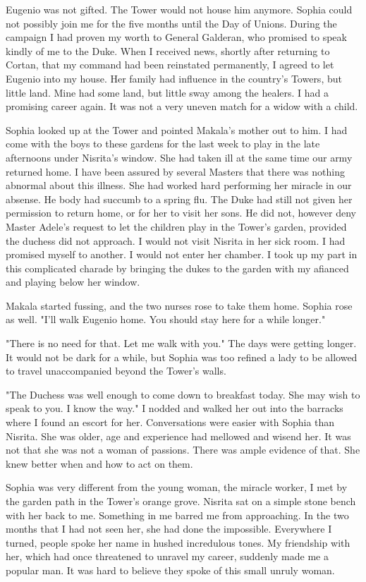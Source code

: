 \documentclass{article}
\begin{document}
Eugenio was not gifted. The Tower would not house him anymore. Sophia could not possibly join me for the five months until the Day of Unions. During the campaign I had proven my worth to General Galderan, who promised to speak kindly of me to the Duke. When I received news, shortly after returning to Cortan, that my command had been reinstated permanently, I agreed to let Eugenio into my house. Her family had influence in the country's Towers, but little land. Mine had some land, but little sway among the healers. I had a promising career again. It was not a very uneven match for a widow with a child.

Sophia looked up at the Tower and pointed Makala's mother out to him. I had come with the boys to these gardens for the last week to play in the late afternoons under Nisrita's window. She had taken ill at the same time our army returned home. I have been assured by several Masters that there was nothing abnormal about this illness. She had worked hard performing her miracle in our absense. He body had succumb to a spring flu. The Duke had still not given her permission to return home, or for her to visit her sons. He did not, however deny Master Adele's request to let the children play in the Tower's garden, provided the duchess did not approach. I would not visit Nisrita in her sick room. I had promised myself to another. I would not enter her chamber. I took up my part in this complicated charade by bringing the dukes to the garden with my afianced and playing below her window.

Makala started fussing, and the two nurses rose to take them home. Sophia rose as well. "I'll walk Eugenio home. You should stay here for a while longer."

"There is no need for that. Let me walk with you." The days were getting longer. It would not be dark for a while, but Sophia was too refined a lady to be allowed to travel unaccompanied beyond the Tower's walls.

"The Duchess was well enough to come down to breakfast today. She may wish to speak to you. I know the way." I nodded and walked her out into the barracks where I found an escort for her. Conversations were easier with Sophia than Nisrita. She was older, age and experience had mellowed and wisend her. It was not that she was not a woman of passions. There was ample evidence of that. She knew better when and how to act on them. 

Sophia was very different from the young woman, the miracle worker, I met by the garden path in the Tower's orange grove. Nisrita sat on a simple stone bench with her back to me. Something in me barred me from approaching. In the two months that I had not seen her, she had done the impossible. Everywhere I turned, people spoke her name in hushed incredulous tones. My friendship with her, which had once threatened to unravel my career, suddenly made me a popular man. It was hard to believe they spoke of this small unruly woman. 
\end{document}
